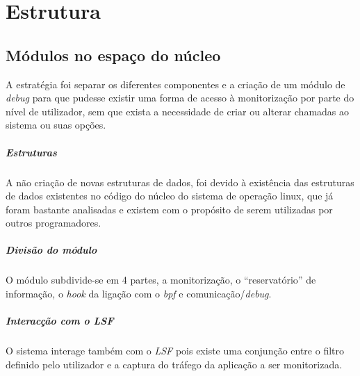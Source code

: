 \chapter{Estrutura}
\label{cap:Estrutura}




\section{Módulos no espaço do núcleo}

A estratégia foi separar os diferentes componentes e a criação de um módulo de
\textit{debug} para que pudesse existir uma forma de acesso à monitorização por
parte do nível de utilizador, sem que exista a necessidade de criar ou alterar
chamadas ao sistema ou suas opções.

\paragraph{Estruturas}

A não criação de novas estruturas de dados, foi devido à existência das
estruturas de dados existentes no código do núcleo do sistema de operação
linux, que já foram bastante analisadas e existem com o propósito de serem
utilizadas por outros programadores.

\paragraph{Divisão do módulo} 

O módulo subdivide-se em 4 partes, a monitorização, o ``reservatório'' de
informação, o \textit{hook} da ligação com o \textit{bpf} e
comunicação/\textit{debug}.

\paragraph{Interacção com o LSF}
O sistema interage também com o \textit{LSF} pois existe uma conjunção
entre o filtro definido pelo utilizador e a captura do tráfego da aplicação a
ser monitorizada.


